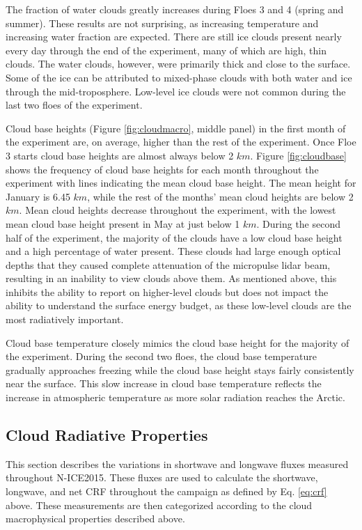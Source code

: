 The fraction of water clouds greatly increases during Floes 3 and 4 (spring and summer). These results are not surprising, as increasing temperature and increasing water fraction are expected. There are still ice clouds present nearly every day through the end of the experiment, many of which are high, thin clouds. The water clouds, however, were primarily thick and close to the surface. Some of the ice can be attributed to mixed-phase clouds with both water and ice through the mid-troposphere. Low-level ice clouds were not common during the last two floes of the experiment.

Cloud base heights (Figure \ref{fig:cloudmacro}, middle panel) in the first month of the experiment are, on average, higher than the rest of the experiment. Once Floe 3 starts cloud base heights are almost always below 2 $km$. Figure \ref{fig:cloudbase} shows the frequency of cloud base heights for each month throughout the experiment with lines indicating the mean cloud base height. The mean height for January is 6.45 $km$, while the rest of the months' mean cloud heights are below 2 $km$. Mean cloud heights decrease throughout the experiment, with the lowest mean cloud base height present in May at just below 1 $km$. During the second half of the experiment, the majority of the clouds have a low cloud base height and a high percentage of water present. These clouds had large enough optical depths that they caused complete attenuation of the micropulse lidar beam, resulting in an inability to view clouds above them. As mentioned above, this inhibits the ability to report on higher-level clouds but does not impact the ability to understand the surface energy budget, as these low-level clouds are the most radiatively important.

Cloud base temperature closely mimics the cloud base height for the majority of the experiment. During the second two floes, the cloud base temperature gradually approaches freezing while the cloud base height stays fairly consistently near the surface. This slow increase in cloud base temperature reflects the increase in atmospheric temperature as more solar radiation reaches the Arctic. 

\subsection{Cloud Radiative Properties}
This section describes the variations in shortwave and longwave fluxes measured throughout N-ICE2015. These fluxes are used to calculate the shortwave, longwave, and net CRF throughout the campaign as defined by Eq. \ref{eq:crf} above. These measurements are then categorized according to the cloud macrophysical properties described above.

